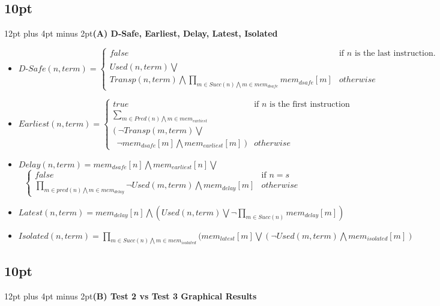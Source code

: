 \documentclass[onecolumn,10pt]{journal}
\begin{document}
\titlespacing\subsection*{10pt}{12pt plus 4pt minus 2pt}\textbf{(A) D-Safe, Earliest, Delay, Latest, Isolated}
\begin{itemize}
\item $
D\text{-}Safe(n, term) = 
\begin{cases}
false & \text{if } n\text{ is the last instruction.} \\
\\
Used(n, term) \bigvee \\
Transp(n, term) \bigwedge \prod\limits_{m \in Succ(n) \bigwedge m \in mem_{dsafe}}mem_{dsafe}[m] & otherwise
\end{cases}
$

\item $
Earliest(n, term) = \begin{cases}
true & \text{if }n\text{ is the first instruction} \\
\sum\limits_{m \in Pred(n) \bigwedge m \in mem_{earliest}} \\
(\ \neg Transp(m, term) \bigvee \\
\ \ \neg mem_{dsafe}[m] \bigwedge mem_{earliest}[m]\ ) & otherwise
\end{cases}
$

\item $Delay(n, term) = mem_{dsafe}[n] \bigwedge mem_{earliest}[n] \bigvee$
$$\begin{cases}
false & \text{if }n = s \\
\prod\limits_{m\in pred(n) \bigwedge m \in mem_{delay}} \neg Used(m, term) \bigwedge mem_{delay}[m] & otherwise
\end{cases}$$

\item $Latest(n, term) = mem_{delay}[n] \bigwedge (Used(n, term) \bigvee \neg \prod\limits_{m \in Succ(n)} mem_{delay}[m]) $

\item $Isolated(n, term) = \prod\limits_{m \in Succ(n) \bigwedge m \in mem_{isolated}}(mem_{latest}[m] \bigvee (\neg Used(m, term) \bigwedge mem_{isolated}[m])$


\end{itemize}

\pagebreak

\titlespacing\subsection*{10pt}{12pt plus 4pt minus 2pt}\textbf{(B) Test 2 vs Test 3 Graphical Results }
\end{document}
